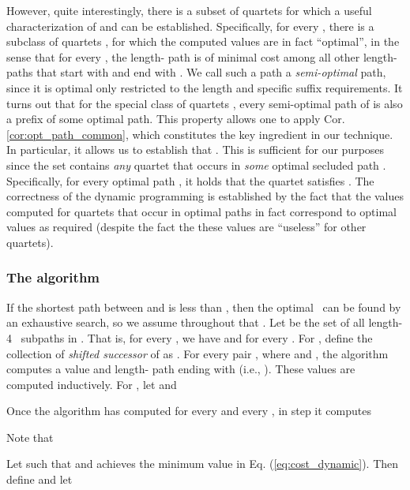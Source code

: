 \documentclass[12pt]{article}
\newcommand{\PP}[0]{ }
\newcommand{\DegThreeConst}[0]{4}
\begin{document}
However, quite interestingly, there is a subset of quartets for which a useful characterization of  and  can be established. Specifically, for every , there is a subclass of quartets , for which the computed values are in fact ``optimal'', in the sense that for every , the length- path  is of minimal cost among all other length- paths that start with  and end with . We call such a path a \emph{semi-optimal} path, since it is optimal only restricted to the length and specific suffix requirements. It turns out that for the special class of quartets , every semi-optimal path of  is also a prefix of some optimal  path. This property allows one to apply Cor. \ref{cor:opt_path_common}, which constitutes the key ingredient in our technique. In particular, it allows us to establish that . This is sufficient for our purposes since the set  contains \emph{any} quartet that occurs in \emph{some} optimal secluded  path . Specifically, for every  optimal path , it holds that the quartet  satisfies . The correctness of the dynamic programming is established by the fact that the values computed for quartets that occur in optimal paths in fact correspond to optimal values as required (despite the fact the these values are ``useless'' for other quartets).

\subsubsection{The algorithm}
If the shortest path between  and  is less than , then the optimal \PP\ can be found by an exhaustive search, so we assume throughout that . Let  be the set of all length-\DegThreeConst~ subpaths  in . That is, for every , we have  and  for every .
For , define the collection of \emph{shifted successor} of  as . For every pair , where  and , the algorithm computes a value  and length- path  ending with   (i.e., ). These values are computed inductively. For , let  and

Once the algorithm has computed  for every  and every , in step  it computes

Note that

Let  such that  and  achieves the minimum value in  Eq. (\ref{eq:cost_dynamic}). Then define  and let
\end{document}
